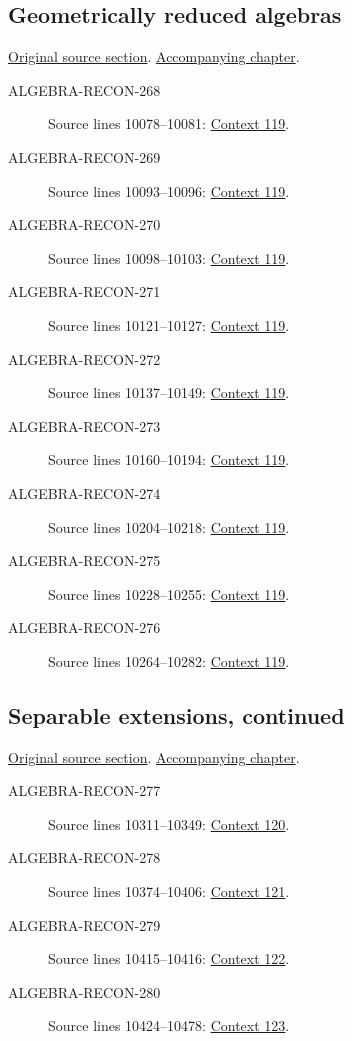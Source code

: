 \subsection{Geometrically reduced algebras}
\hypertarget{algebra-source-section-geometrically-reduced}{}
\noindent\href{https://github.com/stacks/stacks-project/blob/a04446e57ec1fbc252a871afcec7752fb2807b14/algebra.tex\#L10037}{Original source section}. \href{algebra.pdf\#nameddest=section-geometrically-reduced}{Accompanying chapter}.

\begin{description}
\item[ALGEBRA-RECON-268] Source lines 10078--10081: \hyperlink{algebra-context-119}{Context 119}.
\item[ALGEBRA-RECON-269] Source lines 10093--10096: \hyperlink{algebra-context-119}{Context 119}.
\item[ALGEBRA-RECON-270] Source lines 10098--10103: \hyperlink{algebra-context-119}{Context 119}.
\item[ALGEBRA-RECON-271] Source lines 10121--10127: \hyperlink{algebra-context-119}{Context 119}.
\item[ALGEBRA-RECON-272] Source lines 10137--10149: \hyperlink{algebra-context-119}{Context 119}.
\item[ALGEBRA-RECON-273] Source lines 10160--10194: \hyperlink{algebra-context-119}{Context 119}.
\item[ALGEBRA-RECON-274] Source lines 10204--10218: \hyperlink{algebra-context-119}{Context 119}.
\item[ALGEBRA-RECON-275] Source lines 10228--10255: \hyperlink{algebra-context-119}{Context 119}.
\item[ALGEBRA-RECON-276] Source lines 10264--10282: \hyperlink{algebra-context-119}{Context 119}.
\end{description}

\subsection{Separable extensions, continued}
\hypertarget{algebra-source-section-separability-continued}{}
\noindent\href{https://github.com/stacks/stacks-project/blob/a04446e57ec1fbc252a871afcec7752fb2807b14/algebra.tex\#L10288}{Original source section}. \href{algebra.pdf\#nameddest=section-separability-continued}{Accompanying chapter}.

\begin{description}
\item[ALGEBRA-RECON-277] Source lines 10311--10349: \hyperlink{algebra-context-120}{Context 120}.
\item[ALGEBRA-RECON-278] Source lines 10374--10406: \hyperlink{algebra-context-121}{Context 121}.
\item[ALGEBRA-RECON-279] Source lines 10415--10416: \hyperlink{algebra-context-122}{Context 122}.
\item[ALGEBRA-RECON-280] Source lines 10424--10478: \hyperlink{algebra-context-123}{Context 123}.
\end{description}

